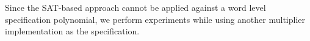 Since the SAT-based approach cannot be applied against a word level specification polynomial, 
we perform experiments while using another multiplier implementation as the specification.
